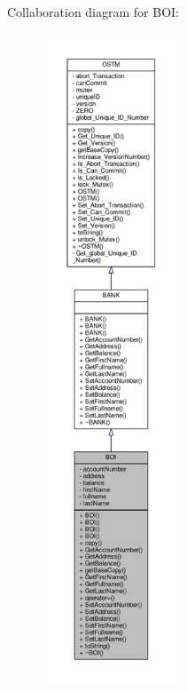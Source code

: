 Collaboration diagram for B\+OI\+:\nopagebreak
\begin{figure}[H]
\begin{center}
\leavevmode
\includegraphics[height=550pt]{class_b_o_i__coll__graph}
\end{center}
\end{figure}
